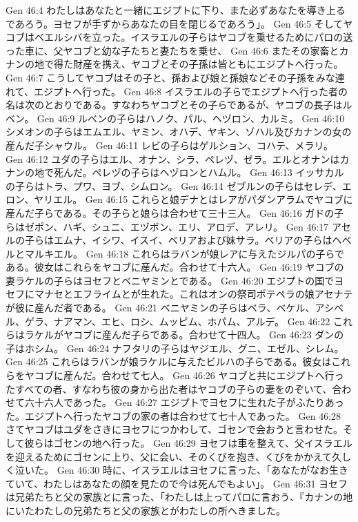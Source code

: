 Gen 46:4  わたしはあなたと一緒にエジプトに下り、また必ずあなたを導き上るであろう。ヨセフが手ずからあなたの目を閉じるであろう」。
Gen 46:5  そしてヤコブはベエルシバを立った。イスラエルの子らはヤコブを乗せるためにパロの送った車に、父ヤコブと幼な子たちと妻たちを乗せ、
Gen 46:6  またその家畜とカナンの地で得た財産を携え、ヤコブとその子孫は皆ともにエジプトへ行った。
Gen 46:7  こうしてヤコブはその子と、孫および娘と孫娘などその子孫をみな連れて、エジプトへ行った。
Gen 46:8  イスラエルの子らでエジプトへ行った者の名は次のとおりである。すなわちヤコブとその子らであるが、ヤコブの長子はルベン。
Gen 46:9  ルベンの子らはハノク、パル、ヘヅロン、カルミ。
Gen 46:10  シメオンの子らはエムエル、ヤミン、オハデ、ヤキン、ゾハル及びカナンの女の産んだ子シャウル。
Gen 46:11  レビの子らはゲルション、コハテ、メラリ。
Gen 46:12  ユダの子らはエル、オナン、シラ、ペレヅ、ゼラ。エルとオナンはカナンの地で死んだ。ペレヅの子らはヘヅロンとハムル。
Gen 46:13  イッサカルの子らはトラ、プワ、ヨブ、シムロン。
Gen 46:14  ゼブルンの子らはセレデ、エロン、ヤリエル。
Gen 46:15  これらと娘デナとはレアがパダンアラムでヤコブに産んだ子らである。その子らと娘らは合わせて三十三人。
Gen 46:16  ガドの子らはゼポン、ハギ、シュニ、エヅボン、エリ、アロデ、アレリ。
Gen 46:17  アセルの子らはエムナ、イシワ、イスイ、ベリアおよび妹サラ。ベリアの子らはヘベルとマルキエル。
Gen 46:18  これらはラバンが娘レアに与えたジルパの子らである。彼女はこれらをヤコブに産んだ。合わせて十六人。
Gen 46:19  ヤコブの妻ラケルの子らはヨセフとベニヤミンとである。
Gen 46:20  エジプトの国でヨセフにマナセとエフライムとが生れた。これはオンの祭司ポテペラの娘アセナテが彼に産んだ者である。
Gen 46:21  ベニヤミンの子らはベラ、ベケル、アシベル、ゲラ、ナアマン、エヒ、ロシ、ムッピム、ホパム、アルデ。
Gen 46:22  これらはラケルがヤコブに産んだ子らである。合わせて十四人。
Gen 46:23  ダンの子はホシム。
Gen 46:24  ナフタリの子らはヤジエル、グニ、エゼル、シレム。
Gen 46:25  これらはラバンが娘ラケルに与えたビルハの子らである。彼女はこれらをヤコブに産んだ。合わせて七人。
Gen 46:26  ヤコブと共にエジプトへ行ったすべての者、すなわち彼の身から出た者はヤコブの子らの妻をのぞいて、合わせて六十六人であった。
Gen 46:27  エジプトでヨセフに生れた子がふたりあった。エジプトへ行ったヤコブの家の者は合わせて七十人であった。
Gen 46:28  さてヤコブはユダをさきにヨセフにつかわして、ゴセンで会おうと言わせた。そして彼らはゴセンの地へ行った。
Gen 46:29  ヨセフは車を整えて、父イスラエルを迎えるためにゴセンに上り、父に会い、そのくびを抱き、くびをかかえて久しく泣いた。
Gen 46:30  時に、イスラエルはヨセフに言った、「あなたがなお生きていて、わたしはあなたの顔を見たので今は死んでもよい」。
Gen 46:31  ヨセフは兄弟たちと父の家族とに言った、「わたしは上ってパロに言おう、『カナンの地にいたわたしの兄弟たちと父の家族とがわたしの所へきました。
